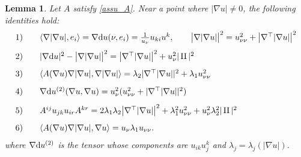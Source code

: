 \documentclass[10 pt,a4paper]{article}
\newtheorem{lemma}[definition]{Lemma}
\theoremstyle{definition}
\begin{document}
\begin{lemma}\label{lem_basicomp}
	Let $A$ satisfy \eqref{assu_A}. Near a point where $|\nabla u| \neq 0$, the following identities hold:
	\begin{equation}
		\begin{array}{ll}\label{identities}
			1) & \quad \langle \nabla |\nabla u|, e_i\rangle = \nabla \di  u(\nu, e_i) = \frac{1}{u_\nu} u_{ki}u^k, \qquad \big| \nabla |\nabla u|\big|^2 = u_{\nu\nu}^2 + \big| \nabla^\top  |\nabla u|\big|^2 \\[0.3cm]
			2) & \quad |\nabla \di  u|^2 - \big| \nabla |\nabla u|\big|^2 = \big| \nabla^\top   |\nabla u|\big|^2 + u_\nu^2|\II|^2 \\[0.3cm]
			3) & \quad \langle A(\nabla u)\nabla |\nabla u|, \nabla |\nabla u|\rangle %
			= \lambda_2|\nabla^\top  |\nabla u||^2 + \lambda_1 u_{\nu\nu}^2 \\[0.3cm]
			4) & \quad \nabla \di u^{(2)}(\nabla u, \nabla u) = u_\nu^2( u_{\nu\nu}^2 + |\nabla^\top  |\nabla u||^2) \\[0.3cm]
			5) & \quad A^{ij}u_{jk}u_{ir}A^{kr} = 2\lambda_1\lambda_2 \big|\nabla^\top  |\nabla u|\big|^2 + \lambda_1^2u_{\nu\nu}^2 + u_\nu^2\lambda_2^2|\II|^2 \\[0.3cm]
			6) & \quad \langle A(\nabla u) \nabla |\nabla u|, \nabla u \rangle 
			= u_\nu \lambda_1 u_{\nu\nu}. 
		\end{array}
	\end{equation}
	where $\nabla \mathrm{d} u^{(2)}$ is the tensor whose components are $u_{ik}u^k_j$ and $\lambda_j = \lambda_j(|\nabla u|)$.
\end{lemma}
\end{document}
